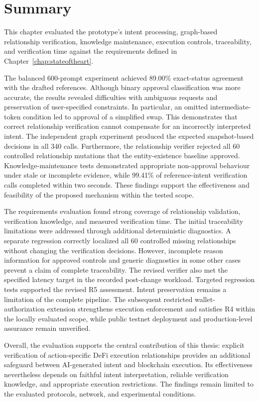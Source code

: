 
\section{Summary}
\label{sec:evaluation_summary}

This chapter evaluated the prototype's intent processing, graph-based
relationship verification, knowledge maintenance, execution controls,
traceability, and verification time against the requirements defined in
Chapter~\ref{chap:stateoftheart}.

The balanced 600-prompt experiment achieved 89.00\% exact-status agreement
with the drafted references. Although binary approval classification was
more accurate, the results revealed difficulties with ambiguous requests
and preservation of user-specified constraints. In particular, an omitted
intermediate-token condition led to approval of a simplified swap. This
demonstrates that correct relationship verification cannot compensate for
an incorrectly interpreted intent. The independent graph experiment produced the expected snapshot-based
decisions in all 340 calls. Furthermore, the relationship verifier rejected
all 60 controlled relationship mutations that the entity-existence baseline
approved. Knowledge-maintenance tests demonstrated appropriate non-approval
behaviour under stale or incomplete evidence, while 99.41\% of reference-intent
verification calls completed within two seconds. These findings support the
effectiveness and feasibility of the proposed mechanism within the tested
scope. 

The requirements evaluation found strong coverage of relationship validation,
verification knowledge, and measured verification time. 
The initial traceability limitations were addressed through additional
deterministic diagnostics. A separate regression correctly localized
all 60 controlled missing relationships without changing the
verification decisions. However, incomplete reason information for
approved controls and generic diagnostics in some other cases prevent
a claim of complete traceability. The revised verifier also met the
specified latency target in the recorded post-change workload. Targeted
regression tests supported the revised R5 assessment. Intent preservation remains a limitation of the complete
pipeline. The subsequent restricted wallet-authorization
extension strengthens execution enforcement and satisfies R4
within the locally evaluated scope, while public testnet
deployment and production-level assurance remain unverified.

Overall, the evaluation supports the central contribution of this thesis:
explicit verification of action-specific DeFi execution relationships provides
an additional safeguard between AI-generated intent and blockchain execution.
Its effectiveness nevertheless depends on faithful intent interpretation,
reliable verification knowledge, and appropriate execution restrictions.
The findings remain limited to the evaluated protocols, network, and
experimental conditions.

